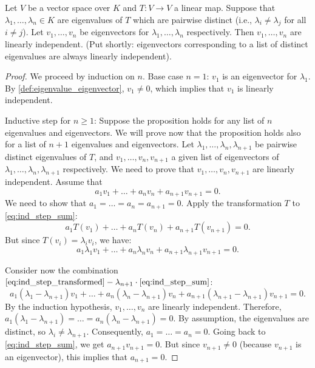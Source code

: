 \begin{proposition} \label{prop:lin_indep_eigen}
  Let $V$ be a vector space over $K$ and $T: V \rightarrow V$ a linear map. Suppose that $\lambda_1, \dots, \lambda_n \in K$ are eigenvalues of $T$ which are pairwise distinct (i.e., $\lambda_i \ne \lambda_j$ for all $i \ne j$). Let $v_1, \dots, v_n$ be eigenvectors for $\lambda_1, \dots, \lambda_n$ respectively. Then $v_1, \dots, v_n$ are linearly independent. (Put shortly: eigenvectors corresponding to a list of distinct eigenvalues are always linearly independent).
\end{proposition}

\begin{proof}
  We proceed by induction on $n$.
  Base case $n=1$: $v_1$ is an eigenvector for $\lambda_1$. By \cref{def:eigenvalue_eigenvector}, $v_1 \ne 0$, which implies that $v_1$ is linearly independent.

  Inductive step for $n \ge 1$: Suppose the proposition holds for any list of $n$ eigenvalues and eigenvectors. We will prove now that the proposition holds also for a list of $n+1$ eigenvalues and eigenvectors.
  Let $\lambda_1, \dots, \lambda_n, \lambda_{n+1}$ be pairwise distinct eigenvalues of $T$, and $v_1, \dots, v_n, v_{n+1}$ a given list of eigenvectors of $\lambda_1, \dots, \lambda_n, \lambda_{n+1}$ respectively. We need to prove that $v_1, \dots, v_n, v_{n+1}$ are linearly independent.
  Assume that
  \begin{equation} \label{eq:ind_step_sum} %
    a_1 v_1 + \dots + a_n v_n + a_{n+1} v_{n+1} = 0.
  \end{equation}
  We need to show that $a_1 = \dots = a_n = a_{n+1} = 0$.
  Apply the transformation $T$ to \eqref{eq:ind_step_sum}:
  \[ a_1 T(v_1) + \dots + a_n T(v_n) + a_{n+1} T(v_{n+1}) = 0. \]
  But since $T(v_i) = \lambda_i v_i$, we have:
  \begin{equation} \label{eq:ind_step_transformed}
    a_1 \lambda_1 v_1 + \dots + a_n \lambda_n v_n + a_{n+1} \lambda_{n+1} v_{n+1} = 0.
  \end{equation}

  Consider now the combination $\eqref{eq:ind_step_transformed} - \lambda_{n+1} \cdot \eqref{eq:ind_step_sum}$:
  \[ a_1(\lambda_1 - \lambda_{n+1})v_1 + \dots + a_n(\lambda_n - \lambda_{n+1})v_n + a_{n+1}(\lambda_{n+1} - \lambda_{n+1})v_{n+1} = 0. \]
  By the induction hypothesis, $v_1, \dots, v_n$ are linearly independent.
  Therefore, $a_1(\lambda_1 - \lambda_{n+1}) = \dots = a_n(\lambda_n - \lambda_{n+1}) = 0$.
  By assumption, the eigenvalues are distinct, so $\lambda_i \ne \lambda_{n+1}$. Consequently, $a_1 = \dots = a_n = 0$.
  Going back to \eqref{eq:ind_step_sum}, we get $a_{n+1} v_{n+1} = 0$.
  But since $v_{n+1} \ne 0$ (because $v_{n+1}$ is an eigenvector), this implies that $a_{n+1} = 0$.
\end{proof}

